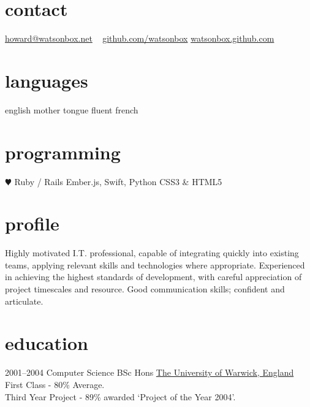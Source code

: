 \documentclass[]{friggeri-cv} %
\begin{document}


\begin{aside} %
\section{contact}
\href{mailto:howard@watsonbox.net}{howard@watsonbox.net}
~
\href{http://github.com/watsonbox}{github.com/watsonbox}
\href{http://watsonbox.github.com}{watsonbox.github.com}
\section{languages}
english mother tongue
fluent french
\section{programming}
{\color{red} $\varheartsuit$} Ruby / Rails
Ember.js, Swift, Python
CSS3 \& HTML5
\end{aside}


\section{profile}

Highly motivated I.T. professional, capable of integrating quickly into existing teams, applying relevant skills and technologies where appropriate. Experienced in achieving the highest standards of development, with careful appreciation of project timescales and resource. Good communication skills; confident and articulate.

\section{education}

\begin{entrylist}
\entry
{2001--2004}
{Computer Science {\normalfont BSc Hons}}
{\href{http://www.warwick.ac.uk}{The University of Warwick, England}}
{First Class - 80\% Average.\\
Third Year Project - 89\% awarded `Project of the Year 2004'.}
\end{entrylist}
\end{document}
